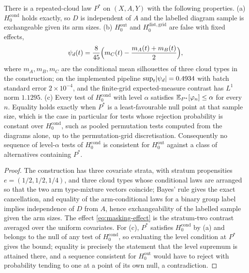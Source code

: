 \begin{theorem}[Masking]
\label{thm:masking}
There is a repeated-cloud law $P^\ast$ on $(X,A,Y)$ with the following properties.
(a) $H_0^{\mathrm{cond}}$ holds exactly, so $D$ is independent of $A$ and the labelled diagram sample is exchangeable given its arm sizes.
(b) $H_0^{\mathrm{out}}$ and $H_0^{\mathrm{dist,grid}}$ are false with fixed effects,
\begin{equation}
\psi_d(t)=\frac{8}{45}\Bigl(m_C(t)-\frac{m_A(t)+m_B(t)}{2}\Bigr),
\label{eq:masking-effect}
\end{equation}
where $m_A,m_B,m_C$ are the conditional mean silhouettes of three cloud types in the construction; on the implemented pipeline $\sup_t\lvert \psi_d\rvert=0.4934$ with batch standard error $2\times10^{-4}$, and the finite-grid expected-measure contrast has $L^1$ norm $1.1295$.
(c) Every test of $H_0^{\mathrm{cond}}$ with level $\alpha$ satisfies $\mathbb{E}_{P^\ast}[\varphi_n]\le\alpha$ for every $n$. Equality holds exactly when $P^\ast$ is a least-favourable null point at that sample size, which is the case in particular for tests whose rejection probability is constant over $H_0^{\mathrm{cond}}$, such as pooled permutation tests computed from the diagrams alone, up to the permutation-grid discretisation. Consequently no sequence of level-$\alpha$ tests of $H_0^{\mathrm{cond}}$ is consistent for $H_0^{\mathrm{out}}$ against a class of alternatives containing $P^\ast$.
\end{theorem}

\begin{proof}
The construction has three covariate strata, with stratum propensities $e=(1/2,1/2,1/4)$, and three cloud types whose conditional laws are arranged so that the two arm type-mixture vectors coincide; Bayes' rule gives the exact cancellation, and equality of the arm-conditional laws for a binary group label implies independence of $D$ from $A$, hence exchangeability of the labelled sample given the arm sizes. The effect \eqref{eq:masking-effect} is the stratum-two contrast averaged over the uniform covariates. For (c), $P^\ast$ satisfies $H_0^{\mathrm{cond}}$ by (a) and belongs to the null of any test of $H_0^{\mathrm{cond}}$, so evaluating the level condition at $P^\ast$ gives the bound; equality is precisely the statement that the level supremum is attained there, and a sequence consistent for $H_0^{\mathrm{out}}$ would have to reject with probability tending to one at a point of its own null, a contradiction.
\end{proof}

